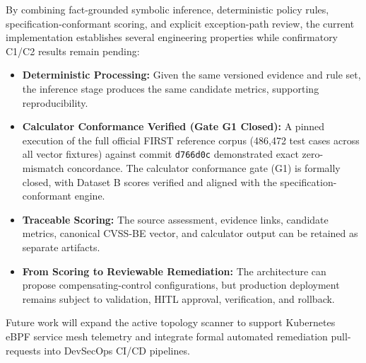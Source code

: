 By combining fact-grounded symbolic inference, deterministic policy rules, specification-conformant scoring, and explicit exception-path review, the current implementation establishes several engineering properties while confirmatory C1/C2 results remain pending:
\begin{itemize}
    \item \textbf{Deterministic Processing:} Given the same versioned evidence and rule set, the inference stage produces the same candidate metrics, supporting reproducibility.
    \item \textbf{Calculator Conformance Verified (Gate G1 Closed):} A pinned execution of the full official FIRST reference corpus (486,472 test cases across all vector fixtures) against commit \texttt{d766d0c} demonstrated exact zero-mismatch concordance. The calculator conformance gate (G1) is formally closed, with Dataset B scores verified and aligned with the specification-conformant engine.
    \item \textbf{Traceable Scoring:} The source assessment, evidence links, candidate metrics, canonical CVSS-BE vector, and calculator output can be retained as separate artifacts.
    \item \textbf{From Scoring to Reviewable Remediation:} The architecture can propose compensating-control configurations, but production deployment remains subject to validation, HITL approval, verification, and rollback.
\end{itemize}

Future work will expand the active topology scanner to support Kubernetes eBPF service mesh telemetry and integrate formal automated remediation pull-requests into DevSecOps CI/CD pipelines.

